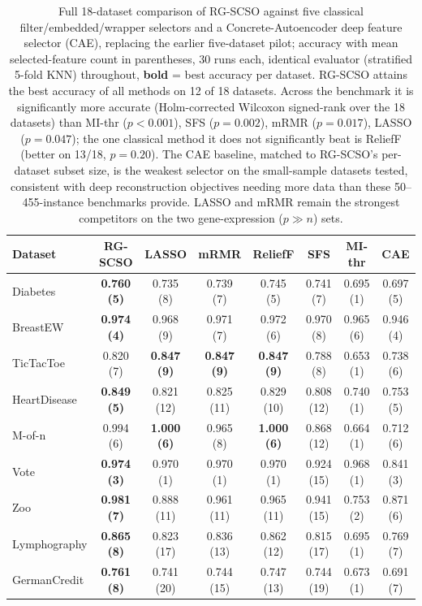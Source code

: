 \documentclass[iicol,sn-basic,pdflatex]{sn-jnl}
\begin{document}
\begin{table}
\centering
\caption{Full 18-dataset comparison of RG-SCSO against five classical filter/embedded/wrapper selectors and a Concrete-Autoencoder deep feature selector (CAE), replacing the earlier five-dataset pilot; accuracy with mean selected-feature count in parentheses, 30 runs each, identical evaluator (stratified 5-fold KNN) throughout, \textbf{bold} = best accuracy per dataset. RG-SCSO attains the best accuracy of all methods on 12 of 18 datasets. Across the benchmark it is significantly more accurate (Holm-corrected Wilcoxon signed-rank over the 18 datasets) than MI-thr ($p<0.001$), SFS ($p=0.002$), mRMR ($p=0.017$), LASSO ($p=0.047$); the one classical method it does not significantly beat is ReliefF (better on 13/18, $p=0.20$). The CAE baseline, matched to RG-SCSO's per-dataset subset size, is the weakest selector on the small-sample datasets tested, consistent with deep reconstruction objectives needing more data than these 50--455-instance benchmarks provide. LASSO and mRMR remain the strongest competitors on the two gene-expression ($p\gg n$) sets.}
\label{tab:classic}
\scriptsize
\setlength{\tabcolsep}{3.5pt}
\begin{tabular}{lccccccc}
\toprule
Dataset & RG-SCSO & LASSO & mRMR & ReliefF & SFS & MI-thr & CAE \\
\midrule
Diabetes & \textbf{0.760 (5)} & 0.735 (8) & 0.739 (7) & 0.745 (5) & 0.741 (7) & 0.695 (1) & 0.697 (5) \\
BreastEW & \textbf{0.974 (4)} & 0.968 (9) & 0.971 (7) & 0.972 (6) & 0.970 (8) & 0.965 (6) & 0.946 (4) \\
TicTacToe & 0.820 (7) & \textbf{0.847 (9)} & \textbf{0.847 (9)} & \textbf{0.847 (9)} & 0.788 (8) & 0.653 (1) & 0.738 (6) \\
HeartDisease & \textbf{0.849 (5)} & 0.821 (12) & 0.825 (11) & 0.829 (10) & 0.808 (12) & 0.740 (1) & 0.753 (5) \\
M-of-n & 0.994 (6) & \textbf{1.000 (6)} & 0.965 (8) & \textbf{1.000 (6)} & 0.868 (12) & 0.664 (1) & 0.712 (6) \\
Vote & \textbf{0.974 (3)} & 0.970 (1) & 0.970 (1) & 0.970 (1) & 0.924 (15) & 0.968 (1) & 0.841 (3) \\
Zoo & \textbf{0.981 (7)} & 0.888 (11) & 0.961 (11) & 0.965 (11) & 0.941 (15) & 0.753 (2) & 0.871 (6) \\
Lymphography & \textbf{0.865 (8)} & 0.823 (17) & 0.836 (13) & 0.862 (12) & 0.815 (17) & 0.695 (1) & 0.769 (7) \\
GermanCredit & \textbf{0.761 (8)} & 0.741 (20) & 0.744 (15) & 0.747 (13) & 0.744 (19) & 0.673 (1) & 0.691 (7) \\

\end{tabular}
\end{table}
\end{document}
